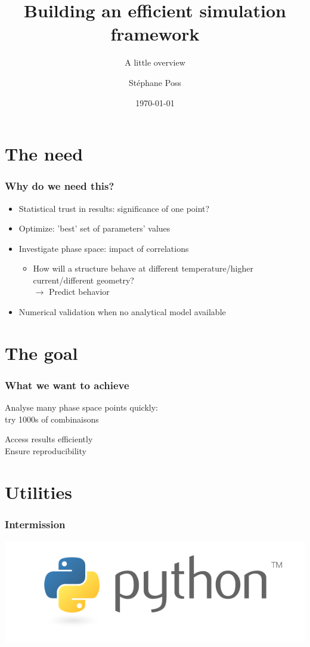 \documentclass[14pt]{beamer}
\title{Building an efficient simulation framework}
\subtitle{A little overview}
\author{St\'ephane Poss}
\date{\today}
\begin{document}
\begin{frame}[plain]
\titlepage
\end{frame}

\begin{frame}
\tableofcontents
\end{frame}

\section{The need}
\begin{frame}
\frametitle{Why do we need this?}
\begin{itemize}
\item Statistical trust in results: significance of one point?
\pause
\item Optimize: 'best' set of parameters' values
\pause
\item Investigate phase space: impact of correlations
\begin{itemize}
\item How will a structure behave at different temperature/higher current/different geometry?\\ 
\pause
\alert{$\rightarrow$ Predict behavior}
\end{itemize}
\pause
\item Numerical validation when no analytical model available
\end{itemize}
\end{frame}

\section{The goal}
\begin{frame}
\frametitle{What we want to achieve}
\begin{block}{}
Analyse many phase space points quickly: \\try 1000s of combinaisons
\end{block}
\begin{block}{}
Access results efficiently\\
Ensure reproducibility
\end{block}
\end{frame}

\section{Utilities}
\begin{frame}
\frametitle{Intermission}
\centering
\includegraphics[width=\textwidth]{python-logo-master-v3-TM.png}
\end{frame}
\end{document}
